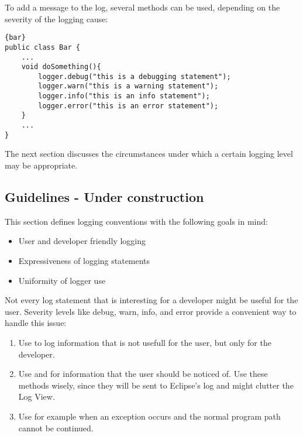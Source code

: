 \documentclass{seal_article}
\begin{document}
To add a message to the log, several methods can be used, depending on the severity of the logging cause:\\

\lstset{language=java}
\begin{lstlisting}[frame=tbrl, caption=org.evolizer.foo.Bar -- Logging]{bar}
public class Bar {
	...
	void doSomething(){
		logger.debug("this is a debugging statement");
		logger.warn("this is a warning statement");
		logger.info("this is an info statement");
		logger.error("this is an error statement");
	}
	...
}
\end{lstlisting}

The next section discusses the circumstances under which a certain logging level may be appropriate.

\newpage

\subsection{Guidelines - Under construction}

This section defines logging conventions with the following goals in mind:

\begin{itemize}
	\item{User and developer friendly logging}
	\item{Expressiveness of logging statements}
	\item{Uniformity of logger use}
\end{itemize}

Not every log statement that is interesting for a developer might be useful for the user. Severity levels like debug, warn, info, and error provide a convenient way to handle this issue:

\begin{enumerate}

	\item{Use  to log information that is not usefull for the user, but only for the developer.}

	\item{Use  and  for information that the user should be noticed of. Use these methods wisely, since they will be sent \eg to Eclipse's log and might clutter the Log View.}

	\item{Use  for example when an exception occurs and the normal program path cannot be continued.}

\end{enumerate}
\end{document}
